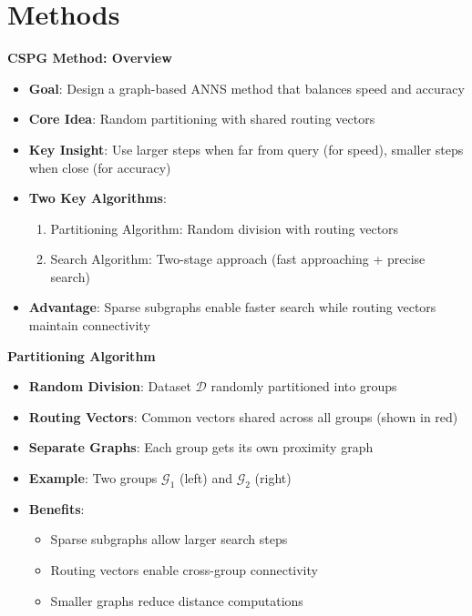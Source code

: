 \section{Methods}%
\begin{frame}
\centering
\LARGE\textbf{CSPG Method: Overview}

\vspace{5mm}

\begin{itemize}
    \item \textbf{Goal}: Design a graph-based ANNS method that balances speed and accuracy
    \item \textbf{Core Idea}: Random partitioning with shared routing vectors
    \item \textbf{Key Insight}: Use larger steps when far from query (for speed), smaller steps when close (for accuracy)
    \item \textbf{Two Key Algorithms}:
    \begin{enumerate}
        \item Partitioning Algorithm: Random division with routing vectors
        \item Search Algorithm: Two-stage approach (fast approaching + precise search)
    \end{enumerate}
    \item \textbf{Advantage}: Sparse subgraphs enable faster search while routing vectors maintain connectivity
\end{itemize}
\end{frame}%
\begin{frame}
\begin{center}
\LARGE\textbf{Partitioning Algorithm}
\end{center}

\vspace{5mm}

\begin{itemize}
    \item \textbf{Random Division}: Dataset $\mathcal{D}$ randomly partitioned into groups
    \item \textbf{Routing Vectors}: Common vectors shared across all groups (shown in red)
    \item \textbf{Separate Graphs}: Each group gets its own proximity graph
    \item \textbf{Example}: Two groups $\mathcal{G}_1$ (left) and $\mathcal{G}_2$ (right)
    \item \textbf{Benefits}:
    \begin{itemize}
        \item Sparse subgraphs allow larger search steps
        \item Routing vectors enable cross-group connectivity
        \item Smaller graphs reduce distance computations
    \end{itemize}
\end{itemize}
\end{frame}%
